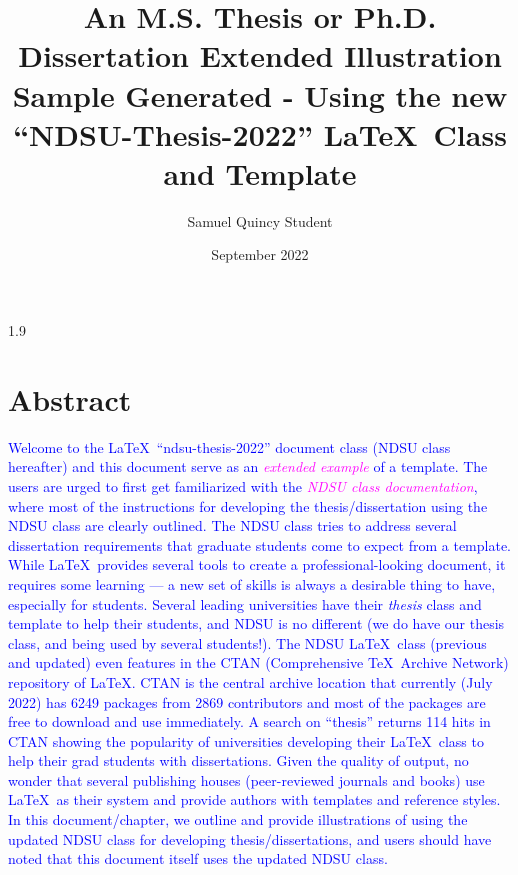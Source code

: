 \documentclass[phd]{ndsu-thesis-2022}
\title{An M.S. Thesis or Ph.D. Dissertation Extended Illustration Sample Generated - Using the new ``NDSU-Thesis-2022'' \LaTeX\ Class and Template}
\author{Samuel Quincy Student}
\date{September 2022}
\newcommand\myspacing{1.9}      %
\newcommand\italk[1]{\textcolor{blue}{#1}}  %
\begin{document}
\begin{spacing}{\myspacing}      %



\section{Abstract}
\italk{Welcome to the \LaTeX\ ``ndsu-thesis-2022'' document class (NDSU class hereafter) and this document serve as an \textcolor{magenta}{\emph{extended example}} of a template. The users are urged to first get familiarized with the \textcolor{magenta}{\emph{NDSU class documentation}}, where most of the instructions for developing the thesis/dissertation using the NDSU class are clearly outlined. The NDSU class tries to address several dissertation requirements that graduate students come to expect from a template. While \LaTeX\ provides several tools to create a professional-looking document, it requires some learning --- a new set of skills is always a desirable thing to have, especially for students. Several leading universities have their \emph{thesis} class and template to help their students, and NDSU is no different (we do have our thesis class, and being used by several students!). The NDSU \LaTeX\ class (previous and updated) even features in the CTAN (Comprehensive \TeX\ Archive Network) repository of \LaTeX. CTAN is the central archive location that currently (July 2022) has 6249 packages from 2869 contributors and most of the packages are free to download and use immediately. A search on ``thesis'' returns 114 hits in CTAN showing the popularity of universities developing their \LaTeX\ class to help their grad students with dissertations. Given the quality of output, no wonder that several publishing houses (peer-reviewed journals and books) use \LaTeX\ as their system and provide authors with templates and reference styles. In this document/chapter, we outline and provide illustrations of using the updated NDSU class for developing thesis/dissertations, and users should have noted that this document itself uses the updated NDSU class.\\ 
}


\end{spacing}
\end{document}
